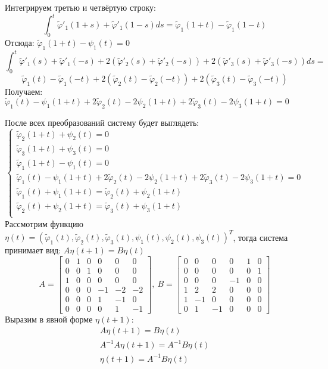 \documentclass[a4paper, 12pt,fleqn]{extarticle}
\begin{document}
Интегрируем третью и четвёртую строку:
\[\int_0^t \tilde{\varphi}'_1(1+s)+\tilde{\varphi}'_1(1-s)ds=
\tilde{\varphi}_1(1+t)-\tilde{\varphi}_1(1-t)\]
Отсюда: $\tilde{\varphi}_1(1+t)-\psi_1(t)=0$
\[\int_0^t \tilde{\varphi}'_1(s)+\tilde{\varphi}'_1(-s)+2(\tilde{\varphi}'_2(s)+\tilde{\varphi}'_2(-s))+2(\tilde{\varphi}'_3(s)+\tilde{\varphi}'_3(-s))ds=\]
\[\tilde{\varphi}_1(t)-\tilde{\varphi}_1(-t)+2(\tilde{\varphi}_2(t)-\tilde{\varphi}_2(-t))+2(\tilde{\varphi}_3(t)-\tilde{\varphi}_3(-t))\]
Получаем: $\tilde{\varphi}_1(t)-\psi_1(1+t)+2\tilde{\varphi}_2(t)-2\psi_2(1+t)+2\tilde{\varphi}_3(t)-2\psi_3(1+t)=0$

После всех преобразований систему будет выглядеть:
\[\begin{cases}
    \tilde{\varphi}_2(1+t)+\psi_2(t)=0\\
    \tilde{\varphi}_3(1+t)+\psi_3(t)=0\\
    \tilde{\varphi}_1(1+t)-\psi_1(t)=0\\
    \tilde{\varphi}_1(t)-\psi_1(1+t)+2\tilde{\varphi}_2(t)-2\psi_2(1+t)+2\tilde{\varphi}_3(t)-2\psi_3(1+t)=0\\
    \tilde{\varphi}_1(t)+\psi_1(1+t)=\tilde{\varphi}_2(t)+\psi_2(1+t)\\
    \tilde{\varphi}_2(t)+\psi_2(1+t)=\tilde{\varphi}_3(t)+\psi_3(1+t)\\
\end{cases}\]
Рассмотрим функцию $\eta(t)=(\tilde{\varphi}_1(t),\tilde{\varphi}_2(t),\tilde{\varphi}_3(t),\psi_1(t),\psi_2(t),\psi_3(t))^T$, тогда система принимает вид:
$A\eta(t+1)=B\eta(t)$
\[A=\begin{bmatrix}
    0 & 1 & 0 & 0 & 0 & 0\\
0 & 0 & 1 & 0 & 0 & 0\\
1 & 0 & 0 & 0 & 0 & 0\\
0 & 0 & 0 & -1 & -2 & -2\\
0 & 0 & 0 & 1 & -1 & 0\\
0 & 0 & 0 & 0 & 1 & -1
\end{bmatrix},\ B=\begin{bmatrix}
0 & 0 & 0 & 0 & 1 & 0\\
0 & 0 & 0 & 0 & 0 & 1\\
0 & 0 & 0 & -1 & 0 & 0\\
1 & 2 & 2 & 0 & 0 & 0\\
1 & -1 & 0 & 0 & 0 & 0\\
0 & 1 & -1 & 0 & 0 & 0
\end{bmatrix}\]
Выразим в явной форме $\eta(t+1)$:
\begin{gather*}
    A\eta(t+1)=B\eta(t)\\
    A^{-1}A\eta(t+1)=A^{-1}B\eta(t) \\
    \eta(t+1)=A^{-1}B\eta(t)
\end{gather*}
\end{document}
